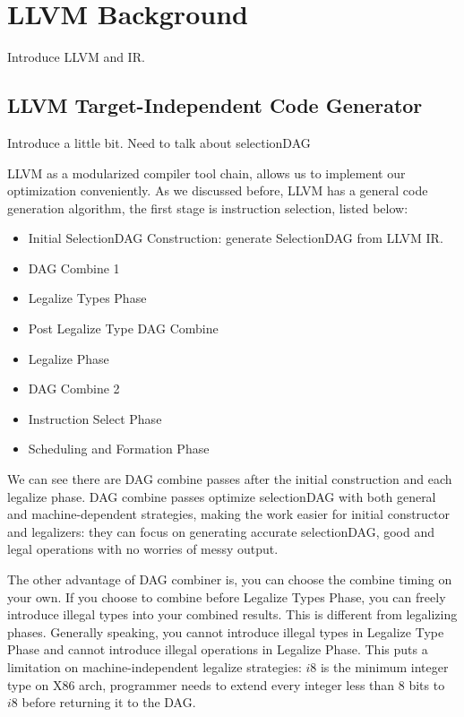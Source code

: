 %
%

\chapter{LLVM Background}
\label{two}

Introduce LLVM and IR.

\section{LLVM Target-Independent Code Generator}
Introduce a little bit.
Need to talk about selectionDAG

LLVM as a modularized compiler tool chain, allows us to implement our optimization conveniently. As we discussed before, LLVM has a general code generation algorithm, the first stage is instruction selection, listed below\cite{llvm_code_gen}:

\begin{itemize}
  \item Initial SelectionDAG Construction: generate SelectionDAG from LLVM IR.
  \item DAG Combine 1
  \item Legalize Types Phase
  \item Post Legalize Type DAG Combine
  \item Legalize Phase
  \item DAG Combine 2
  \item Instruction Select Phase
  \item Scheduling and Formation Phase
\end{itemize}

We can see there are DAG combine passes after the initial construction and each legalize phase\cite{llvm_code_gen}. DAG combine passes optimize selectionDAG with both general and machine-dependent strategies, making the work easier for initial constructor and legalizers: they can focus on generating accurate selectionDAG, good and legal operations with no worries of messy output.

The other advantage of DAG combiner is, you can choose the combine timing on your own. If you choose to combine before Legalize Types Phase, you can freely introduce illegal types into your combined results. This is different from legalizing phases. Generally speaking, you cannot introduce illegal types in Legalize Type Phase and cannot introduce illegal operations in Legalize Phase. This puts a limitation on machine-independent legalize strategies: $i8$ is the minimum integer type on X86 arch, programmer needs to extend every integer less than 8 bits to $i8$ before returning it to the DAG.

